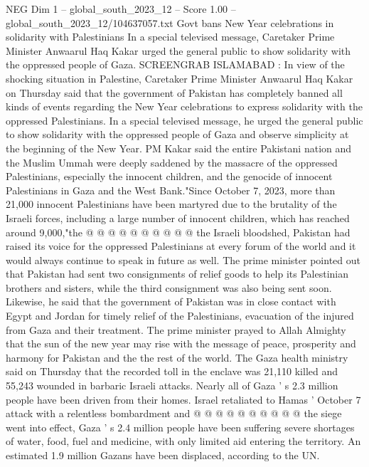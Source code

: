 \begin{textsample}{NEG Dim 1 – global\_south\_2023\_12 – Score 1.00 – global\_south\_2023\_12/104637057.txt}  \label{ex:f1_neg_293}
Govt bans New Year celebrations in solidarity with Palestinians In a special televised message, Caretaker Prime Minister Anwaarul Haq Kakar urged the general public to show solidarity with the oppressed people of Gaza.
SCREENGRAB ISLAMABAD : In view of the shocking situation in Palestine, Caretaker Prime Minister Anwaarul Haq Kakar on Thursday said that the government of Pakistan has completely banned all kinds of events regarding the New Year celebrations to express solidarity with the oppressed Palestinians.
In a special televised message, he urged the general public to show solidarity with the oppressed people of Gaza and observe simplicity at the beginning of the New Year.
PM Kakar said the entire Pakistani nation and the Muslim Ummah were deeply saddened by the massacre of the oppressed Palestinians, especially the innocent children, and the genocide of innocent Palestinians in Gaza and the West Bank."Since October 7, 2023, more than 21,000 innocent Palestinians have been martyred due to the brutality of the Israeli forces, including a large number of innocent children, which has reached around 9,000,"the @ @ @ @ @ @ @ @ @ @ the Israeli bloodshed, Pakistan had raised its voice for the oppressed Palestinians at every forum of the world and it would always continue to speak in future as well.
The prime minister pointed out that Pakistan had sent two consignments of relief goods to help its Palestinian brothers and sisters, while the third consignment was also being sent soon.
Likewise, he said that the government of Pakistan was in close contact with Egypt and Jordan for timely relief of the Palestinians, evacuation of the injured from Gaza and their treatment.
The prime minister prayed to Allah Almighty that the sun of the new year may rise with the message of peace, prosperity and harmony for Pakistan and the the rest of the world.
The Gaza health ministry said on Thursday that the recorded toll in the enclave was 21,110 killed and 55,243 wounded in barbaric Israeli attacks.
Nearly all of Gaza ' s 2.3 million people have been driven from their homes.
Israel retaliated to Hamas ' October 7 attack with a relentless bombardment and @ @ @ @ @ @ @ @ @ @ the siege went into effect, Gaza ' s 2.4 million people have been suffering severe shortages of water, food, fuel and medicine, with only limited aid entering the territory.
An estimated 1.9 million Gazans have been displaced, according to the UN.

\end{textsample}
